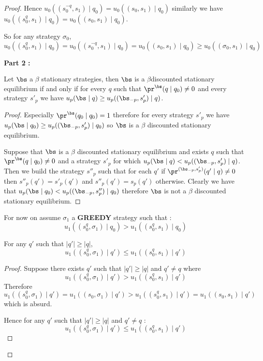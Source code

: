 \begin{proof}
Hence $u_0((s^{-q}_0,s_1) \mid q_0) = u_0((s_0,s_1) \mid q_0)$ similarly we have $u_0((s^q_0,s_1) \mid q_0) = u_0((s_0,s_1) \mid q_0)$.

So for any strategy $\sigma_0$,  $$u_0((s^q_0,s_1) \mid q_0) = u_0((s^{-q}_0,s_1) \mid q_0) = u_0((s_0,s_1) \mid q_0) \geq u_0((\sigma_0,s_1) \mid q_0)$$ 


\textbf{ Part 2 : }

\begin{mylem}
	Let $\bs$ a $\beta$ stationary strategies, then $\bs$ is a $\beta $discounted stationary equilibrium if and only if for every $q$ such that $\pr^{\bs}(q \mid q_0) \neq 0$ and every strategy $s'_p$ we have $u_p(\bs \mid q) \geq u_p((\bs_{-p},s'_p) \mid q)$.
\end{mylem}
\begin{proof}
	Especially $\pr^{\bs}(q_0 \mid q_0) = 1$ therefore for every strategy $s'_p$ we have $u_p(\bs \mid q_0) \geq u_p((\bs_{-p},s'_p) \mid q_0)$ so $\bs$ is a $\beta$ discounted stationary equilibrium.
	
	Suppose that $\bs$ is a $\beta$ discounted stationary equilibrium and exists $q$ such that $\pr^{\bs}(q \mid q_0) \neq 0$ and a strategy $s'_p$ for which $u_p(\bs \mid q) < u_p((\bs_{-p},s'_p) \mid q)$.
	Then we build the strategy $s''_p$ such that for each $q'$ if $\pr^{(\bs_{-p},s'_p)}(q' \mid q) \neq 0$ then $s''_p(q') = s'_p(q')$ and $s''_p(q') = s_p(q')$ otherwise. Clearly we have that $u_p(\bs \mid q_0) < u_p((\bs_{-p},s''_p) \mid q_0)$ therefore $\bs$ is not a $\beta$ discounted stationary equilibrium.
\end{proof}


For now on assume $\sigma_1$ a \textbf{GREEDY} strategy such that : $$u_1((s^{q}_0,\sigma_1) \mid q_0) >  u_1((s^{q}_0,s_1) \mid q_0)$$
\begin{mylem}
	\label{lemq}
	For any $q'$ such that $|q'| \geq |q|$, 
	$$u_1((s^{q}_0,\sigma_1) \mid q') \leq  u_1((s^{q}_0,s_1) \mid q')$$
\end{mylem}
\begin{proof}

Suppose there exists $q'$ such that $|q'| \geq |q|$ and $q' \neq q$ where $$u_1((s^{q}_0,\sigma_1) \mid q') >  u_1((s^{q}_0,s_1) \mid q')$$
Therefore 
$$u_1((s^{q}_0,\sigma_1) \mid q') =  u_1((s_0,\sigma_1) \mid q') >  u_1((s^{q}_0,s_1) \mid q') = u_1((s_0,s_1) \mid q')$$ which is absurd. 

Hence for any $q'$ such that $|q'| \geq |q|$ and $q' \neq q$ : $$u_1((s^{q}_0,\sigma_1) \mid q') \leq  u_1((s^{q}_0,s_1) \mid q')$$ \label{result}


\end{proof}
\end{proof}
